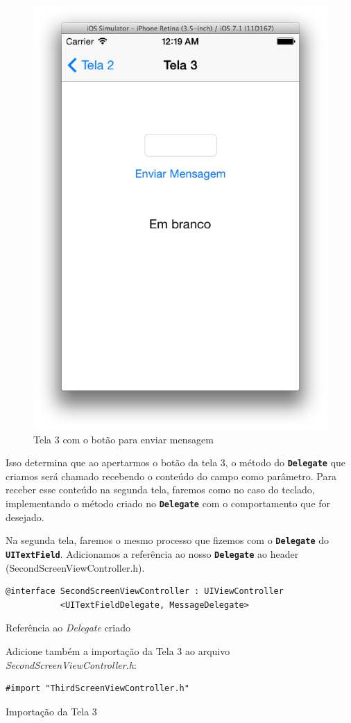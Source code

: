 \documentclass[a4paper,12pt,brazil,oneside]{book}
\begin{document}
\begin{figure}[H]
  \centering
  \includegraphics[width=.55\textwidth]{figuras/3/tela_novo_projeto_49.png}
  \caption{Tela 3 com o botão para enviar mensagem}
  \label{fig:a}
\end{figure}


Isso determina que ao apertarmos o botão da tela 3, o método do \texttt{\textbf{Delegate}} que criamos será chamado recebendo o conteúdo do campo como parâmetro. Para receber esse conteúdo na segunda tela, faremos como no caso do teclado, implementando o método criado no \texttt{\textbf{Delegate}} com o comportamento que for desejado.

Na segunda tela, faremos o mesmo processo que fizemos com o \texttt{\textbf{Delegate}} do \texttt{\textbf{UITextField}}. Adicionamos a referência ao nosso \texttt{\textbf{Delegate}} ao header (SecondScreenViewController.h).\\

\begin{listing}[H]
\begin{verbatim}
@interface SecondScreenViewController : UIViewController
           <UITextFieldDelegate, MessageDelegate>
\end{verbatim}
\caption{Referência ao \emph{Delegate} criado}
\end{listing}


Adicione também a importação da Tela 3 ao arquivo \emph{SecondScreenViewController.h}:

\begin{listing}[H]
\begin{verbatim}
#import "ThirdScreenViewController.h"
\end{verbatim}
\caption{Importação da Tela 3}
\end{listing}
\end{document}
